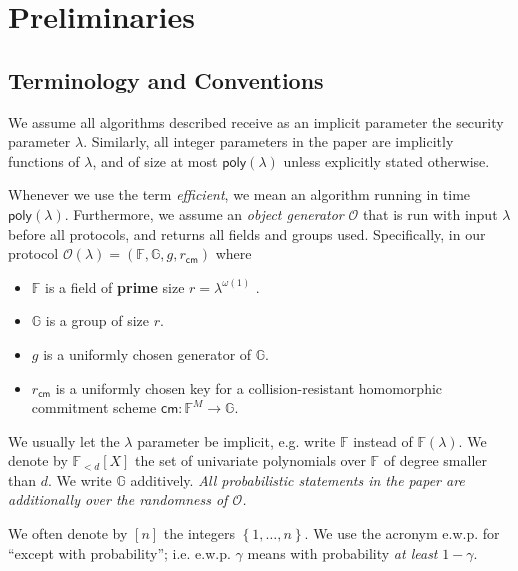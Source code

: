 \documentclass[11pt]{article} %
\newcommand{\G}{\ensuremath{{\mathbb G}}\xspace}
\newcommand{\F}{\ensuremath{\mathbb F}\xspace}
\newcommand{\cm}{\ensuremath{\mathsf{cm}}\xspace}
\newcommand{\defeq}{:=}
\newcommand{\set}[1]{\ensuremath{\left\{#1\right\}}\xspace}
\newcommand{\polysofdeg}[1]{\ensuremath{\F_{< #1}[X]}\xspace}
\newcommand{\obgen}{\ensuremath{\mathcal O}\xspace}
\newcommand{\poly}{\ensuremath{\mathsf{poly(\lambda)}}\xspace}
\newcommand{\cmsetup}{\ensuremath{r_\cm}\xspace}
\begin{document}
\section{Preliminaries}\label{sec:Preliminaries}
\subsection{Terminology and Conventions}\label{sec:terminology}
We assume all algorithms described receive as an implicit parameter the security parameter $\lambda$.
Similarly, all integer parameters in the paper are implicitly functions of $\lambda$, and of size at most \poly unless explicitly stated otherwise.

Whenever we use the term \emph{efficient}, we mean an algorithm running in time \poly. Furthermore,
we assume an \emph{object generator} \obgen that is run with input $\lambda$ before all protocols, and returns all fields and groups used. Specifically, in our protocol $\obgen(\lambda) = (\F, \G,g,\cmsetup)$ where
\begin{itemize}
\item \F is a field of \textbf{prime} size $r = \lambda^{\omega(1)}$
.
\item $\G$ is a group of size $r$.
\item $g$ is a uniformly chosen generator of \G.
\item $\cmsetup$ is a uniformly chosen key for a collision-resistant homomorphic commitment scheme $\cm:\F^M \to \G$.
\end{itemize}
We usually let the $\lambda$ parameter be implicit, e.g. write \F instead of $\F(\lambda)$.
We denote by \polysofdeg{d} the set of univariate polynomials over \F of degree smaller than $d$.
We write \G additively.
\emph{All probabilistic statements in the paper are additionally over the randomness of \obgen.}

We often denote by $[n]$ the integers \set{1,\ldots,n}.
We use the acronym e.w.p. for ``except with probability''; i.e. e.w.p. $\gamma$ means with probability \emph{at least} $1-\gamma$.


\end{document}
